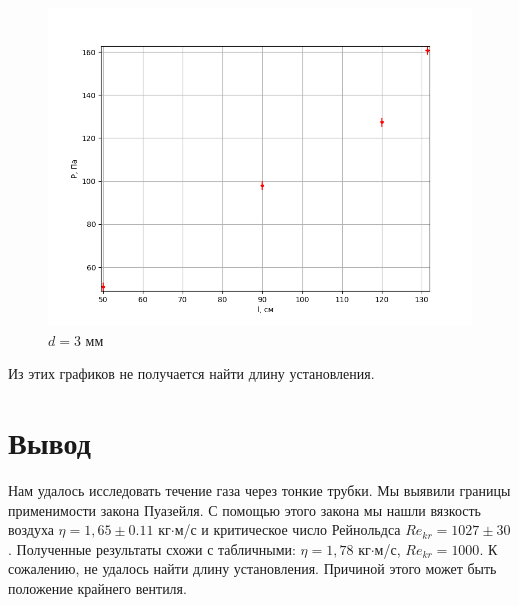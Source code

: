 \documentclass[12pt]{article}
\begin{document}
\begin{figure}[H]
	\centering
	\includegraphics[scale=0.55]{./images/d5mm2.png}
	\caption{$d = 3$ мм}
\end{figure}

Из этих графиков не получается найти длину установления.


\section{Вывод}

Нам удалось исследовать течение газа через тонкие трубки. Мы выявили границы применимости закона Пуазейля. С помощью этого закона мы нашли вязкость воздуха $\eta = 1,65\pm0.11$ кг$\cdot$м/с и критическое число Рейнольдса  $Re_{kr} = 1027\pm30$. Полученные результаты схожи с табличными: $\eta = 1,78$ кг$\cdot$м/с, $Re_{kr} = 1000$. К сожалению, не удалось найти длину установления. Причиной этого может быть положение крайнего вентиля.
\end{document}
